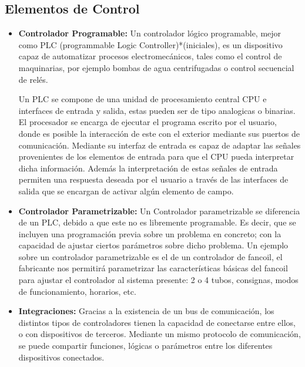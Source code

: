 \subsection{Elementos de Control}
\begin{itemize}
\item \textbf{Controlador Programable:}
Un controlador lógico programable, mejor como PLC (programmable Logic Controller)*(iniciales), es un dispositivo capaz de automatizar procesos electromecánicos, tales como el control de maquinarias, por ejemplo bombas de agua centrifugadas o control secuencial de relés. 

Un PLC se compone de una unidad de procesamiento central CPU e interfaces de entrada y salida, estas pueden ser de tipo analogicas o binarias. El procesador se encarga de ejecutar el programa escrito por el usuario, donde es posible la interacción de este con el exterior mediante sus puertos de comunicación. Mediante su interfaz de entrada es capaz de adaptar las señales provenientes de los elementos de entrada para que el CPU pueda interpretar dicha información. Además la interpretación de estas señales de entrada permiten una respuesta deseada por el usuario a través de las interfaces de salida que se encargan de activar algún elemento de campo. 

\item \textbf{Controlador Parametrizable:}
Un Controlador parametrizable se diferencia de un PLC, debido a que este no es libremente programable. Es decir, que se incluyen una programación previa sobre un problema en concreto; con la capacidad de ajustar ciertos parámetros sobre dicho problema. Un ejemplo sobre un controlador parametrizable es el de un controlador de
fancoil, el fabricante nos permitirá parametrizar las características básicas del fancoil para ajustar el controlador al sistema presente: 2 o 4 tubos, consignas, modos de funcionamiento, horarios, etc.

\item \textbf{Integraciones:}
Gracias a la existencia de un bus de comunicación, los distintos tipos de controladores tienen la capacidad de conectarse entre ellos, o con dispositivos de terceros. Mediante un mismo protocolo de comunicación, se puede compartir funciones, lógicas o parámetros entre los diferentes dispositivos conectados.

\end{itemize}

